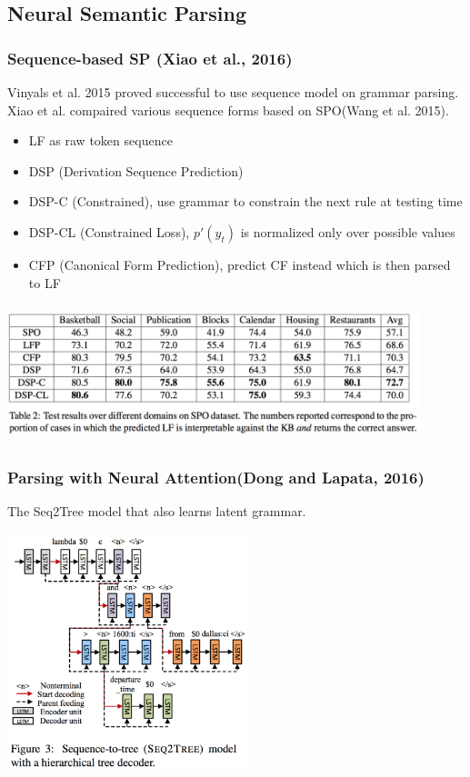 \documentclass{beamer}
\begin{document}
\subsection{Neural Semantic Parsing}
\begin{frame}
    \frametitle{Sequence-based SP (Xiao et al., 2016)}
     {
        Vinyals et al. 2015 proved successful to use sequence model on grammar parsing.
        Xiao et al. compaired various sequence forms based on SPO(Wang et al. 2015).
        \begin{itemize}
            \item LF as raw token sequence
            \item DSP (Derivation Sequence Prediction)
            \item DSP-C (Constrained), use grammar to constrain the next rule at testing time
            \item DSP-CL (Constrained Loss), $p'(y_t)$ is normalized only over possible values
            \item CFP (Canonical Form Prediction), predict CF instead which is then parsed to LF
        \end{itemize}
    }
     {
        \begin{center}
            \includegraphics[width=12cm,height=4cm]{img/seq-comparison.png}
        \end{center}
    }
\end{frame}

\begin{frame}
    \frametitle{Parsing with Neural Attention(Dong and Lapata, 2016)}
    The Seq2Tree model that also learns latent grammar.
    \begin{center}
        \includegraphics[width=7cm,height=7cm]{img/seq-to-tree.png}
    \end{center}
\end{frame}
\end{document}
